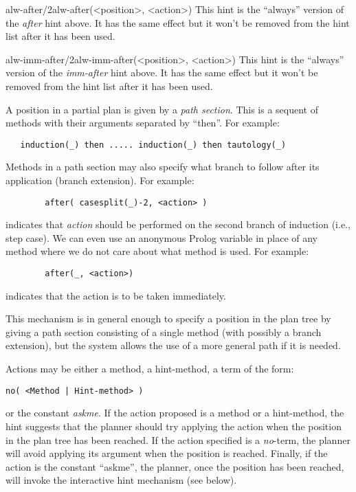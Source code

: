 \begin{predicate}{alw-after/2}{alw-after(<position>, <action>)}%
This hint is the ``always'' version of the {\em after\/} hint
above. It has the same effect but it won't be removed from the hint list
after it has been used.
\end{predicate}

\begin{predicate}{alw-imm-after/2}{alw-imm-after(<position>, <action>)}%
This hint is the ``always'' version of the {\em imm-after\/} hint
above. It has the same effect but it won't be removed from the hint list
after it has been used.
\end{predicate}


        A position in a partial plan is given by a {\em path section}.
This is a sequent of methods with their arguments separated by ``then''.
For example:
\begin{verbatim}
   induction(_) then ..... induction(_) then tautology(_)
\end{verbatim}

        Methods in a path section may also specify what branch to follow
after its application (branch extension). For example: 

\begin{verbatim}
        after( casesplit(_)-2, <action> )
\end{verbatim}

indicates that {\em action\/} should be performed on the second branch of
induction (i.e., step case). We can even use an anonymous Prolog variable in
place of any method where we do not care about what method is used. For
example:

\begin{verbatim}
        after(_, <action>)
\end{verbatim}

indicates that the action is to be taken immediately.

        This mechanism is in general enough to specify a position in
the plan tree by giving a path section consisting of a single method
(with possibly a branch extension), but the system allows the use of a
more general path if it is needed.


        Actions may be either a method, a hint-method, a term of the
form: 
\begin{verbatim}
no( <Method | Hint-method> )\end{verbatim}
 or the constant {\em askme}. If the action proposed is a method or a
hint-method, the hint suggests that the planner should try applying the
action when the position in the plan tree has been reached. If the
action specified is a {\em no\/}-term, the planner will avoid applying
its argument when the position is reached. Finally, if the action is
the constant ``askme'', the planner, once the position has been
reached, will invoke the interactive hint mechanism (see below).

